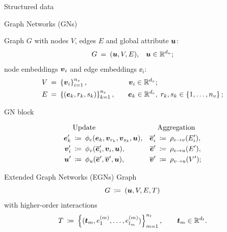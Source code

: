 \begin{frame}{Structured data}
    
    

\end{frame}

\begin{frame}{Graph Networks (GNs)}

    Graph $G$ with nodes $V$, edges $E$ and global attribute $\boldsymbol{u}$:
    \[
        G \: = \: (\boldsymbol{u}, V, E) \text{,} \quad \boldsymbol{u} \in \mathbb{R}^{d_u} \text{;}
    \]
    node embeddings $\boldsymbol{v}_i$ and edge embeddings $\ee_i$:
    \begin{align*}
        V \: &= \: \left\{\boldsymbol{v}_i\right\}_{i=1}^{n_v},             &\quad \boldsymbol{v}_i \in \mathbb{R}^{d_v}&; \\
        E \: &= \: \left\{(\boldsymbol{e}_k, r_k, s_k)\right\}_{k=1}^{n_e}, &\quad \boldsymbol{e}_k \in \mathbb{R}^{d_e}&, \; r_k, s_k \in \left\{1, \dots, n_v\right\};
    \end{align*}
    
\end{frame}

\begin{frame}{GN block}
    
    \begin{align*}
        &\text{Update} & & \text{Aggregation} \\
        \vspace*{2em}
        \ee_k' \: &\coloneqq \: \phi_e(\ee_k, \vv_{r_k}, \vv_{s_k}, \uu), 
        &\overline{\ee}'_i \: &\coloneqq \: \rho_{e \to v}(E_i'), \\
        \vv_i' \: &\coloneqq \: \phi_v(\overline{\ee}'_i, \vv_i, \uu), 
        &\overline{\ee}' \: &\coloneqq \: \rho_{e \to u}(E'), \\
        \uu' \: &\coloneqq \: \phi_u(\overline{\ee}', \overline{\vv}', \uu),
        &\overline{\vv}' \: &\coloneqq \: \rho_{v \to u}(V');
    \end{align*}

    

\end{frame}

\begin{frame}{Extended Graph Networks (EGNs) }
    Graph
    \[ G \: \coloneqq \: (\boldsymbol{u}, V, E, T) \]
    with higher-order interactions
    \[
        T \: \coloneqq \: \left\{(\boldsymbol{t}_m, e_1^{(m)}, \dots, e_{l_m}^{(m)})\right\}_{m=1}^{n_t}, 
        \qquad \boldsymbol{t}_m \in \mathbb{R}^{d_t} \text{.}
    \]
\end{frame}

